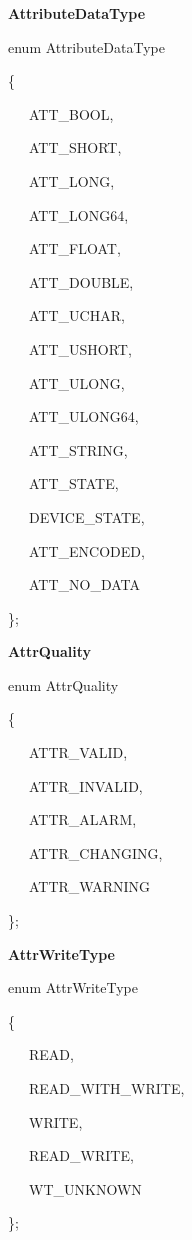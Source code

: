 \begin{flushleft}
\textbf{AttributeDataType}
\par\end{flushleft}

enum AttributeDataType

\{

~~~ATT\_BOOL,

~~~ATT\_SHORT,

~~~ATT\_LONG,

~~~ATT\_LONG64,

~~~ATT\_FLOAT,

~~~ATT\_DOUBLE,

~~~ATT\_UCHAR,

~~~ATT\_USHORT,

~~~ATT\_ULONG,

~~~ATT\_ULONG64,

~~~ATT\_STRING,

~~~ATT\_STATE,

~~~DEVICE\_STATE,

~~~ATT\_ENCODED,

~~~ATT\_NO\_DATA

\};\\


\begin{flushleft}
\textbf{AttrQuality}
\par\end{flushleft}

enum AttrQuality

\{

~~~ATTR\_VALID,

~~~ATTR\_INVALID,

~~~ATTR\_ALARM,

~~~ATTR\_CHANGING,

~~~ATTR\_WARNING

\};\\


\begin{flushleft}
\textbf{AttrWriteType}
\par\end{flushleft}

enum AttrWriteType

\{

~~~READ,

~~~READ\_WITH\_WRITE,

~~~WRITE,

~~~READ\_WRITE,

~~~WT\_UNKNOWN

\};\\


